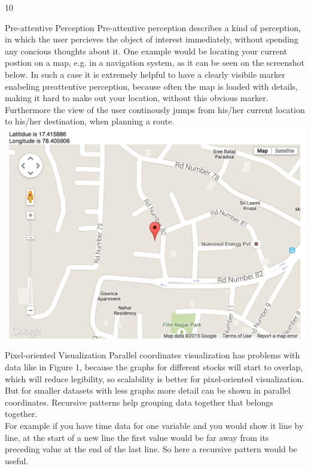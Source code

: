 \documentclass{article}
\begin{document}
\begin{ukon-infie}[24.01.18]{10}
		
		\begin{exercise}[p=2]{Pre-attentive Perception}
		\question{}
		{
		Pre-attentive perception describes a kind of perception, in which the user percieves the object of interest immediately, without spending any concious thoughts about it.
		}
		\newpage
		\question{}
		{
			One example would be locating your current postion on a map, e.g. in a navigation system, as it can be seen on the screenshot below. In such a case it is extremely helpful to have a clearly visibile marker enabeling preattentive perception, because often the map is loaded with details, making it hard to make out your location, without this obvious marker. Furthermore the view of the user continously jumps from his/her current location to his/her destination, when planning a route.\\
			\includegraphics[scale=0.4]{preattentive_perception.png}
		}
		\end{exercise}
		
		\begin{exercise}[p=4]{Pixel-oriented Visualization}
		\question{}
		{
			Parallel coordinates visualization has problems with data like in Figure 1, because the graphs for different stocks will start to overlap, which will reduce legibility, so scalability is better for pixel-oriented visualization. But for smaller datasets with less graphs more detail can be shown in parallel coordinates.
		}
		\question{}
		{
			Recursive patterns help grouping data together that belongs together. \\
			For example if you have time data for one variable and you would show it line by line, at the start of a new line the first value would be far away from its preceding value at the end of the last line. So here a recursive pattern would be useful.
		}
		\end{exercise}


\end{ukon-infie}
\end{document}
